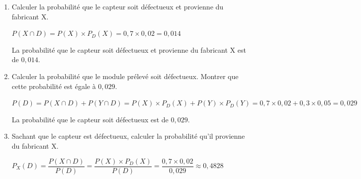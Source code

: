     
\begin{enumerate}[resume=monDS]
    \item Calculer la probabilité que le capteur soit défectueux et provienne du fabricant X.
     \begin{blocvisiblex}[height=2.5]
    {\quad}
    $P(X\cap D)=P(X) \times P_D(X)=0,7 \times 0,02=0,014$

    \smallskip
    La probabilité que le capteur soit défectueux et provienne du fabricant X est de $0,014$.
     \end{blocvisiblex}
     \medskip
    \item Calculer la probabilité que le module prélevé soit défectueux. Montrer que cette probabilité est égale à $0,029$.
    \begin{blocvisiblex}[height=2.5]
    {\quad}
    $P(D)=P(X\cap D)+P(Y\cap D)=P(X) \times P_D(X)+P(Y) \times P_D(Y)=0,7 \times 0,02+0,3 \times 0,05=0,029$

        \smallskip
    La probabilité que le capteur soit défectueux est de $0,029$.
    \end{blocvisiblex}
    \medskip
    \item Sachant que le capteur est défectueux, calculer la probabilité qu'il provienne du fabricant X.
    \begin{blocvisiblex}[height=2.5]
    {\quad}
    $P_X(D)=\dfrac{P(X\cap D)}{P(D)}=\dfrac{P(X) \times P_D(X)}{P(D)}=\dfrac{0,7 \times 0,02}{0,029}\approx 0,4828$


\end{blocvisiblex}
\end{enumerate}
